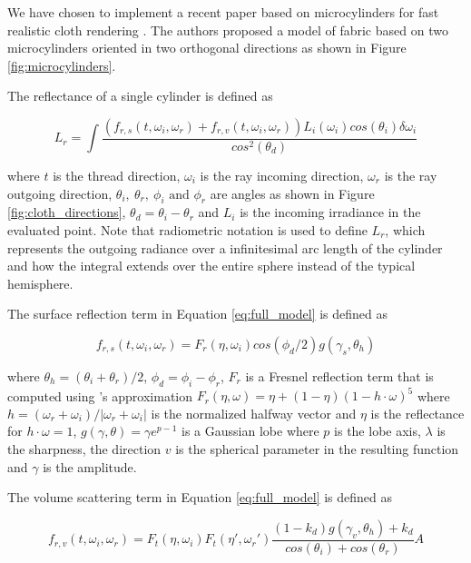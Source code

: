 \documentclass[12pt]{article}
\begin{document}
We have chosen to implement a recent paper based on microcylinders for fast realistic cloth rendering \cite{Sadeghi2013}.
The authors proposed a model of fabric based on two microcylinders oriented in two orthogonal directions as shown in Figure \ref{fig:microcylinders}.

The reflectance of a single cylinder is defined as

\begin{equation}
L_r = \int \frac{\left(f_{r,s}(t, \omega_i, \omega_r) + f_{r,v}(t,\omega_i,\omega_r)\right)L_i(\omega_i)cos(\theta_i)\delta \omega_i}{cos^2(\theta_d)}
\label{eq:full_model}
\end{equation}

where $t$ is the thread direction, $\omega_i$ is the ray incoming direction, $\omega_r$ is the ray outgoing direction, $\theta_i, ~\theta_r, ~ \phi_i \mbox{ and } \phi_r$ are angles as shown in Figure \ref{fig:cloth_directions},  $\theta_d = \theta_i-\theta_r$ and $L_i$ is the incoming irradiance in the evaluated point.
Note that radiometric notation \cite{Marschner2003} is used to define $L_r$, which represents the outgoing radiance over a infinitesimal arc length of the cylinder and how the integral extends over the entire sphere instead of the typical hemisphere.

The surface reflection term in Equation \ref{eq:full_model} is defined as

\begin{equation}
f_{r,s}(t, \omega_i, \omega_r) = F_r(\eta, \omega_i) cos(\phi_d/2)g(\gamma_s, \theta_h)
\end{equation}

where $\theta_h = (\theta_i+\theta_r)/2$, $\phi_d = \phi_i-\phi_r$, $F_r$ is a Fresnel reflection term that is computed using \citeauthor{Schlick1994}'s approximation \cite{Schlick1994} $F_r(\eta, \omega) = \eta + (1 - \eta)(1 - h \cdot \omega)^5$ where $h = (\omega_r + \omega_i)/ \left|\omega_r + \omega_i \right|$ is the normalized halfway vector and $\eta$ is the reflectance for $h \cdot \omega = 1$, $g(\gamma, \theta) = \gamma e ^{p-1}$ is a Gaussian lobe \cite{Wang2008} where $p$ is the lobe axis, $\lambda$ is the sharpness, the direction $v$ is the spherical parameter in the resulting function and $\gamma$ is the amplitude.

The volume scattering term in Equation \ref{eq:full_model} is defined as

\begin{equation}
f_{r,v}(t,\omega_i,\omega_r) = F_t(\eta, \omega_i) F_t(\eta', \omega_r') \frac{(1-k_d)g(\gamma_v, \theta_h)+k_d}{cos(\theta_i) + cos(\theta_r)} A
\end{equation}
\end{document}
